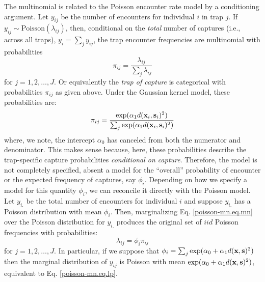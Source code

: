 The multinomial is related to the Poisson encounter rate
model by a conditioning argument. Let $y_{ij}$ be the number of
encounters for individual $i$ in trap $j$. If $y_{ij} \sim
\mbox{Poisson}(\lambda_{ij})$,
then,
conditional on the {\it total}
number of captures (i.e., across all traps), $y_{i} = \sum_{j}
y_{ij}$, the trap encounter frequencies are multinomial with
probabilities
\[
 \pi_{ij} =  \frac{ \lambda_{ij} } { \sum_{j} \lambda_{ij} }
\]
for $j=1,2,\ldots,J$.
Or equivalently the {\it trap of
  capture} is categorical with probabilities $\pi_{ij}$ as given above.
Under the Gaussian kernel model, these probabilities are:
\begin{equation}
\pi_{ij} =  \frac{ \exp(  \alpha_{1}  d({\bf x}_{i},{\bf s}_{i})^2 ) }  {
   \sum_{j} \exp( \alpha_{1} d({\bf x}_{i},{\bf s}_{i})^2)}
\label{poisson-mn.eq.mnprobs}
\end{equation}
where, we note, the intercept $\alpha_{0}$ has canceled from both the
numerator and denominator. This makes sense because, here, these
probabilities describe the trap-specific capture probabilities {\it
  conditional on capture}.  Therefore, the model is not completely
specified, absent a model for the ``overall'' probability of encounter
or the expected frequency of captures, say $\phi_{i}$. Depending on
how we specify a model for this quantity $\phi_{i}$, we can reconcile
it directly with the Poisson model.
Let $y_{i.}$ be the total number of encounters for individual $i$ and
suppose $y_{i.}$ has a Poisson distribution with mean $\phi_{i}$.
Then, marginalizing Eq. \ref{poisson-mn.eq.mn} over the Poisson
distribution for $y_{i.}$ produces the original set of
$iid$ %
Poisson
frequencies with probabilities:
\[
 \lambda_{ij} = \phi_{i} \pi_{ij}
\]
for $j=1,2,\ldots,J$.
In particular, if we suppose that
$\phi_{i} = \sum_{j} \exp(\alpha_{0} + \alpha_{1} d({\bf x},{\bf s})^2)$
then the marginal distribution of $y_{ij}$ is Poisson with mean $\exp(
\alpha_{0} + \alpha_{1} d({\bf x},{\bf s})^2 )$, equivalent to
Eq. \ref{poisson-mn.eq.lp}.


